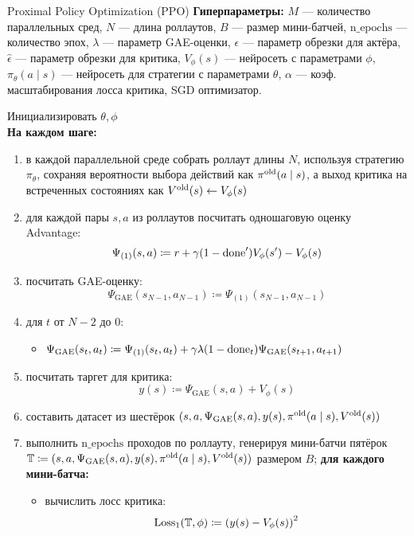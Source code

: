 \begin{algorithm}[label = PPOalgorithm]{Proximal Policy Optimization (PPO)}
\textbf{Гиперпараметры:} $M$ --- количество параллельных сред, $N$ --- длина роллаутов, $B$ --- размер мини-батчей, $\mathrm{n\_epochs}$ --- количество эпох, $\lambda$ --- параметр GAE-оценки, $\epsilon$ --- параметр обрезки для актёра, $\hat{\epsilon}$ --- параметр обрезки для критика, $V_\phi(s)$ --- нейросеть с параметрами $\phi$, $\pi_{\theta}(a \mid s)$ --- нейросеть для стратегии с параметрами $\theta$, $\alpha$ --- коэф. масштабирования лосса критика, SGD оптимизатор.

\vspace{0.3cm}
Инициализировать $\theta, \phi$ \\
\textbf{На каждом шаге:}
\begin{enumerate}
    \item в каждой параллельной среде собрать роллаут длины $N$, используя стратегию $\pi_{\theta}$, сохраняя вероятности выбора действий как $\pi^{\mathrm{old}}(a \mid s)$, а выход критика на встреченных состояниях как $V^{\mathrm{old}}(s) \leftarrow V_{\phi}(s)$
    \item для каждой пары $s, a$ из роллаутов посчитать одношаговую оценку Advantage:
    $$\Psi_{(1)}(s, a) \coloneqq r + \gamma (1 - \mathrm{done}') V_{\phi}(s') - V_{\phi}(s)$$
    \item посчитать GAE-оценку:
    $$\Psi_{\mathrm{GAE}}(s_{N-1}, a_{N-1}) \coloneqq \Psi_{(1)}(s_{N-1}, a_{N-1})$$
    \item для $t$ от $N - 2$ до 0:
    \begin{itemize}
    \item $\Psi_{\mathrm{GAE}}(s_t, a_t) \coloneqq \Psi_{(1)}(s_t, a_t) + \gamma \lambda (1 - \mathrm{done}_t) \Psi_{\mathrm{GAE}}(s_{t+1}, a_{t+1})$
    \end{itemize}
    \item посчитать таргет для критика:
    $$y(s) \coloneqq \Psi_{\mathrm{GAE}}(s, a) + V_{\phi}(s)$$
    \item составить датасет из шестёрок $(s, a, \Psi_{\mathrm{GAE}}(s, a), y(s), \pi^{\mathrm{old}}(a \mid s), V^{\mathrm{old}}(s))$
    \item выполнить $\mathrm{n\_epochs}$ проходов по роллауту, генерируя мини-батчи пятёрок $\mathbb{T} \coloneqq (s, a, \Psi_{\mathrm{GAE}}(s, a), y(s), \pi^{\mathrm{old}}(a \mid s), V^{\mathrm{old}}(s))$ размером $B$; \textbf{для каждого мини-батча:}
    \begin{itemize}
    \item вычислить лосс критика:
    $$\operatorname{Loss}_1(\mathbb{T}, \phi) \coloneqq \left( y(s) - V_\phi(s) \right) ^2$$

\end{itemize}
\end{enumerate}
\end{algorithm}

